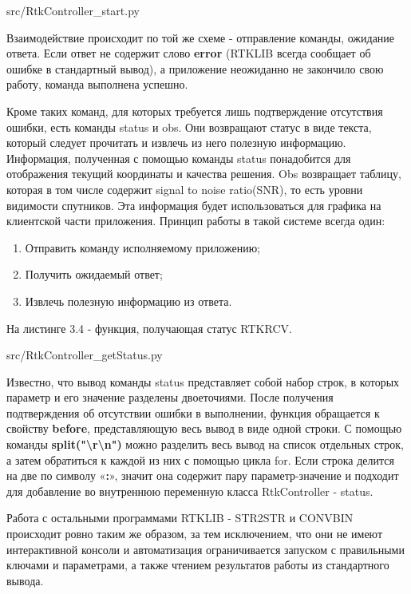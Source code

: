 
{src/RtkController_start.py}

Взаимодействие происходит по той же схеме - отправление команды, ожидание ответа. Если ответ не содержит слово \textbf{error} (RTKLIB всегда сообщает об ошибке в стандартный вывод), а приложение неожиданно не закончило свою работу, команда выполнена успешно.

Кроме таких команд, для которых требуется лишь подтверждение отсутствия ошибки, есть команды status и obs. Они возвращают статус в виде текста, который следует прочитать и извлечь из него полезную информацию. Информация, полученная с помощью команды status понадобится для отображения текущий координаты и качества решения. Obs возвращает таблицу, которая в том числе содержит signal to noise ratio(SNR), то есть уровни видимости спутников. Эта информация будет использоваться для графика на клиентской части приложения. Принцип работы в такой системе всегда один:

\begin{enumerate}
  \item Отправить команду исполняемому приложению;
  \item Получить ожидаемый ответ;
  \item Извлечь полезную информацию из ответа.
\end{enumerate}

На листинге 3.4 - функция, получающая статус RTKRCV.


{src/RtkController_getStatus.py}

Известно, что вывод команды status представляет собой набор строк, в которых параметр и его значение разделены двоеточиями. После получения подтверждения об отсутствии ошибки в выполнении, функция обращается к свойству \textbf{before}, представляющую весь вывод в виде одной строки. С помощью команды \textbf{split("\textbackslash r\textbackslash n")} можно разделить весь вывод на список отдельных строк, а затем обратиться к каждой из них с помощью цикла for. Если строка делится на две по символу «\textbf{:}», значит она содержит пару параметр-значение и подходит для добавление во внутреннюю переменную класса RtkController - status.

Работа с остальными программами RTKLIB - STR2STR и CONVBIN происходит ровно таким же образом, за тем исключением, что они не имеют интерактивной консоли и автоматизация ограничивается запуском с правильными ключами и параметрами, а также чтением результатов работы из стандартного вывода.

